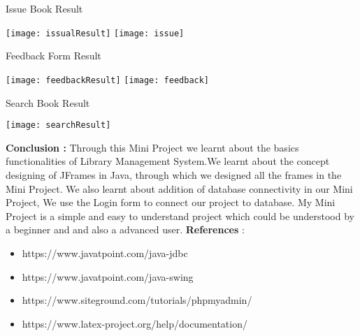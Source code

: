 \documentclass{article}
\begin{document}
\newpage
Issue Book Result\newline
\begin{center}
\texttt{[image: issualResult]}\newline\newline
\texttt{[image: issue]}
\end{center}
\newpage
Feedback Form Result\newline
\begin{center}
\texttt{[image: feedbackResult]}\newline\newline
\texttt{[image: feedback]}
\end{center}
\newpage
Search Book Result\newline
\begin{center}
\texttt{[image: searchResult]}\newline\newline
\end{center}

\newpage

\LARGE
\textbf{Conclusion :}\newline
\Large
Through this Mini Project we learnt about the basics functionalities of Library Management System.We learnt about the concept designing of JFrames in Java, through which we designed all the frames in the Mini Project. We also learnt about addition of database connectivity in our Mini Project, We use the Login form to connect our project to database. My Mini Project is a simple and easy to understand project which could be understood by a beginner and and also a advanced user.\newline \newline
\LARGE
\textbf{References }:  
\Large
\begin{itemize}  
\item https://www.javatpoint.com/java-jdbc
\item https://www.javatpoint.com/java-swing
\item https://www.siteground.com/tutorials/phpmyadmin/
\item https://www.latex-project.org/help/documentation/
\end{itemize}
\end{document}
